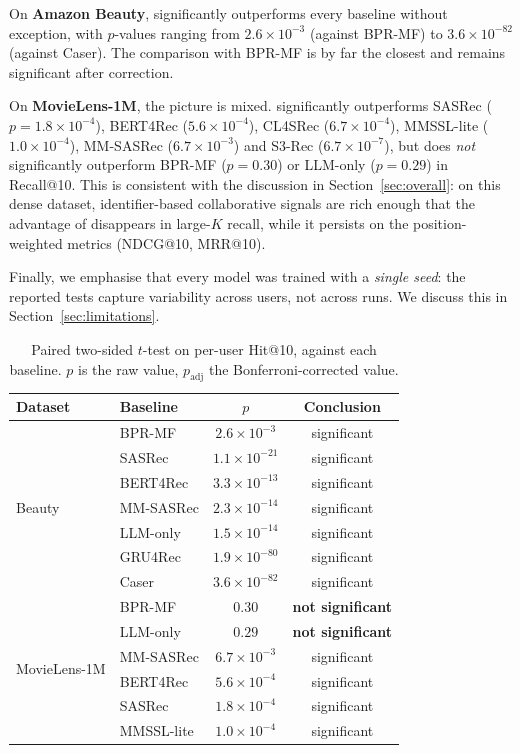 On \textbf{Amazon Beauty}, \model{} significantly outperforms every baseline
without exception, with $p$-values ranging from $2.6\times 10^{-3}$ (against
BPR-MF) to $3.6\times 10^{-82}$ (against Caser). The comparison with BPR-MF is
by far the closest and remains significant after correction.

On \textbf{MovieLens-1M}, the picture is mixed. \model{} significantly
outperforms SASRec ($p=1.8\times 10^{-4}$), BERT4Rec ($5.6\times 10^{-4}$),
CL4SRec ($6.7\times 10^{-4}$), MMSSL-lite ($1.0\times 10^{-4}$), MM-SASRec
($6.7\times 10^{-3}$) and S3-Rec ($6.7\times 10^{-7}$), but does \emph{not}
significantly outperform BPR-MF ($p=0.30$) or LLM-only ($p=0.29$) in Recall@10.
This is consistent with the discussion in Section~\ref{sec:overall}: on this
dense dataset, identifier-based collaborative signals are rich enough that the
advantage of \model{} disappears in large-$K$ recall, while it persists on the
position-weighted metrics (NDCG@10, MRR@10).

Finally, we emphasise that every model was trained with a \emph{single seed}:
the reported tests capture variability across users, not across runs. We discuss
this in Section~\ref{sec:limitations}.

\begin{table}[t]
\centering
\caption{Paired two-sided $t$-test on per-user Hit@10, \model{} against each
baseline. $p$ is the raw value, $p_{\mathrm{adj}}$ the Bonferroni-corrected
value.}
\label{tab:significance}
\small
\begin{tabular}{llcc}
\toprule
\textbf{Dataset} & \textbf{Baseline} & \textbf{$p$} & \textbf{Conclusion} \\
\midrule
\multirow{7}{*}{Beauty}
 & BPR-MF    & $2.6\times10^{-3}$   & significant \\
 & SASRec    & $1.1\times10^{-21}$  & significant \\
 & BERT4Rec  & $3.3\times10^{-13}$  & significant \\
 & MM-SASRec & $2.3\times10^{-14}$  & significant \\
 & LLM-only  & $1.5\times10^{-14}$  & significant \\
 & GRU4Rec   & $1.9\times10^{-80}$  & significant \\
 & Caser     & $3.6\times10^{-82}$  & significant \\
\midrule
\multirow{6}{*}{MovieLens-1M}
 & BPR-MF    & $0.30$              & \textbf{not significant} \\
 & LLM-only  & $0.29$              & \textbf{not significant} \\
 & MM-SASRec & $6.7\times10^{-3}$  & significant \\
 & BERT4Rec  & $5.6\times10^{-4}$  & significant \\
 & SASRec    & $1.8\times10^{-4}$  & significant \\
 & MMSSL-lite& $1.0\times10^{-4}$  & significant \\
\bottomrule
\end{tabular}
\end{table}

